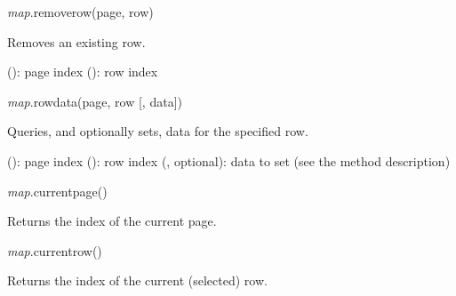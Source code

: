 \documentclass[a4paper,12pt,twoside,extrafontsizes]{memoir}
\begin{document}

\begin{luafuncprototype}
\emph{map}.removerow(page, row)
\end{luafuncprototype}

\begin{funcdescr}
	Removes an existing row.
\end{funcdescr}

\begin{funcparams}
	 (): page index
	 (): row index
\end{funcparams}


\begin{luafuncprototype}
\emph{map}.rowdata(page, row [, data])
\end{luafuncprototype}

\begin{funcdescr}
	Queries, and optionally sets, data for the specified row.
\end{funcdescr}

\begin{funcparams}
	 (): page index
	 (): row index
	 (, optional): data to set (see the  method description)
\end{funcparams}


\begin{luafuncprototype}
\emph{map}.currentpage()
\end{luafuncprototype}

\begin{funcret}
	Returns the index of the current page.
\end{funcret}


\begin{luafuncprototype}
\emph{map}.currentrow()
\end{luafuncprototype}

\begin{funcret}
	Returns the index of the current (selected) row.
\end{funcret}
\end{document}
